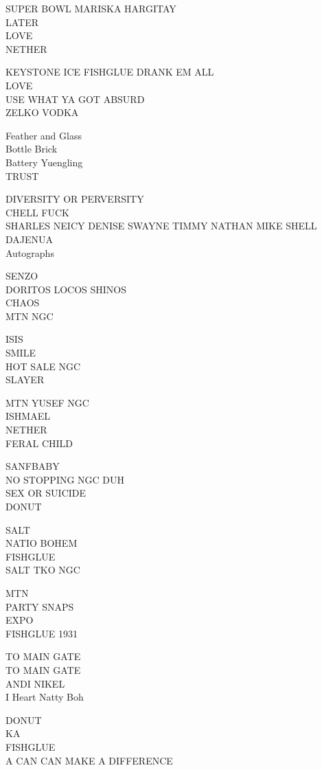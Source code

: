 \documentclass[10pt,letterpaper]{article}
\begin{document}
SUPER BOWL MARISKA HARGITAY\\
LATER\\
LOVE\\
NETHER

KEYSTONE ICE FISHGLUE DRANK EM ALL\\
LOVE\\
USE WHAT YA GOT ABSURD\\
ZELKO VODKA

Feather and Glass\\
Bottle Brick\\
Battery Yuengling\\
TRUST

DIVERSITY OR PERVERSITY\\
CHELL FUCK\\
SHARLES NEICY DENISE SWAYNE TIMMY NATHAN MIKE SHELL DAJENUA\\
Autographs

SENZO\\
DORITOS LOCOS SHINOS\\
CHAOS\\
MTN NGC

ISIS\\
SMILE\\
HOT SALE NGC\\
SLAYER

MTN YUSEF NGC\\
ISHMAEL\\
NETHER\\
FERAL CHILD

SANFBABY\\
NO STOPPING NGC DUH\\
SEX OR SUICIDE\\
DONUT

SALT\\
NATIO BOHEM\\
FISHGLUE\\
SALT TKO NGC

MTN\\
PARTY SNAPS\\
EXPO\\
FISHGLUE 1931

TO MAIN GATE\\
TO MAIN GATE\\
ANDI NIKEL\\
I Heart Natty Boh

DONUT\\
KA\\
FISHGLUE\\
A CAN CAN MAKE A DIFFERENCE
\end{document}
